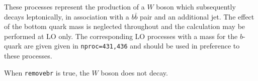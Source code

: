 \label{subsec:wbbjetmassless}

These processes represent the production of a $W$ boson which subsequently
decays leptonically, in association with a $b{\bar b}$ pair and an
additional jet. The effect of the bottom quark mass is neglected throughout
and the calculation may be performed at LO only. The corresponding LO processes
with a mass for the $b$-quark are given given in {\tt nproc=431,436} and should be used
in preference to these processes.

When {\tt removebr} is true, the $W$ boson does not decay.
